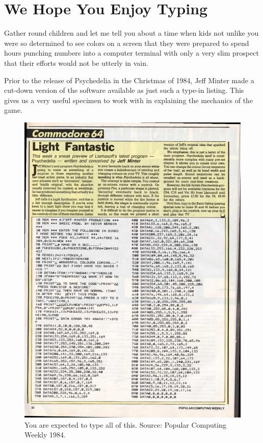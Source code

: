 \chapter{We Hope You Enjoy Typing} 
\lstset{style=6502Style}
Gather round children and let me tell you about a time when kids not unlike you were
so determined to see colors on a screen that they were prepared to spend hours punching
numbers into a computer terminal with only a very slim prospect that their efforts would not be utterly 
in vain.

Prior to the release of Psychedelia in the Christmas of 1984, Jeff Minter made a cut-down version of the
software available as just such a type-in listing. This gives us a very useful specimen to work with in
explaining the mechanics of the game. 

\clearpage
\begin{figure}[H]
    \centering
    \begin{adjustbox}{width=12cm,center}
      \includegraphics[width=12cm]{src/listing/PopularComputing_Weekly_Issue_1984-12-13_0031.jpg}%
    \end{adjustbox}
\caption{You are expected to type all of this. Source: Popular Computing Weekly 1984.}
\end{figure}

